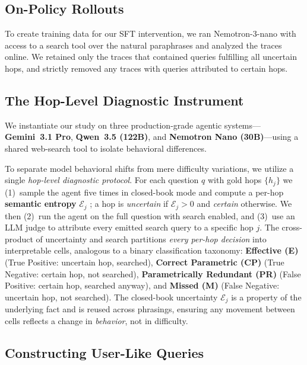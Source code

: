 \documentclass[10pt, letterpaper]{article}
\begin{document}
\subsection{On-Policy Rollouts}
To create training data for our SFT intervention, we ran Nemotron-3-nano with access to a search tool over the natural paraphrases and analyzed the traces online. We retained only the traces that contained queries fulfilling all uncertain hops, and strictly removed any traces with queries attributed to certain hops.

\subsection{The Hop-Level Diagnostic Instrument}\label{sec:setup}

We instantiate our study on three production-grade agentic systems---\textbf{Gemini~3.1
Pro}, \textbf{Qwen~3.5 (122B)}, and \textbf{Nemotron Nano (30B)}---using a shared web-search tool to isolate behavioral differences. 

To separate model behavioral shifts from mere difficulty variations, we utilize a single \emph{hop-level
diagnostic protocol}. For each question $q$ with gold hops
$\{h_j\}$ we (1)~sample the agent five times in closed-book mode and compute a per-hop
\textbf{semantic entropy} $\mathcal{E}_j$ \citep{farquhar_detecting_2024, kuhn_semantic_2023}; a hop is \emph{uncertain}
if $\mathcal{E}_j>0$ and \emph{certain} otherwise. We then (2)~run the agent on the full
question with search enabled, and (3)~use an LLM judge to attribute
every emitted search query to a specific hop $j$. The cross-product of uncertainty and search partitions \emph{every per-hop decision}
into interpretable cells, analogous to a binary classification taxonomy: \textbf{Effective (E)} (True Positive: uncertain hop, searched), \textbf{Correct Parametric (CP)} (True Negative: certain hop, not searched), \textbf{Parametrically Redundant (PR)} (False Positive: certain hop, searched anyway), and \textbf{Missed (M)} (False Negative: uncertain hop, not searched).
The closed-book uncertainty $\mathcal{E}_j$ is a property of the underlying
fact and is reused across phrasings, ensuring any movement between cells reflects a change in
\emph{behavior}, not in difficulty.

\subsection{Constructing User-Like Queries}\label{sec:paraphrase}
\end{document}
